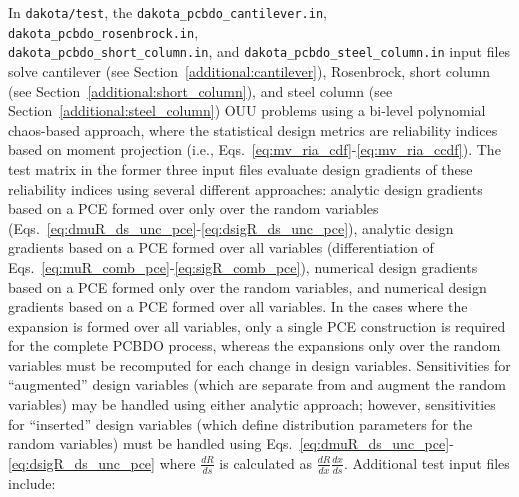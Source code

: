 In \texttt{dakota/test}, the \texttt{dakota\_pcbdo\_cantilever.in},
\texttt{dakota\_pcbdo\_rosenbrock.in},\\
\texttt{dakota\_pcbdo\_short\_column.in}, and
\texttt{dakota\_pcbdo\_steel\_column.in} input files solve 
cantilever (see Section~\ref{additional:cantilever}), Rosenbrock,
short column (see Section~\ref{additional:short_column}), and steel
column (see Section~\ref{additional:steel_column}) OUU problems using
a bi-level polynomial chaos-based approach, where the statistical
design metrics are reliability indices based on moment projection
(i.e., Eqs.~\ref{eq:mv_ria_cdf}-\ref{eq:mv_ria_ccdf}).  The test
matrix in the former three input files evaluate design gradients of
these reliability indices using several different approaches: analytic
design gradients based on a PCE formed over only over the random
variables (Eqs.~\ref{eq:dmuR_ds_unc_pce}-\ref{eq:dsigR_ds_unc_pce}),
analytic design gradients based on a PCE formed over all variables
(differentiation of
Eqs.~\ref{eq:muR_comb_pce}-\ref{eq:sigR_comb_pce}), numerical design
gradients based on a PCE formed only over the random variables, and
numerical design gradients based on a PCE formed over all variables.
In the cases where the expansion is formed over all variables, only a
single PCE construction is required for the complete PCBDO process,
whereas the expansions only over the random variables must be
recomputed for each change in design variables.  Sensitivities for
``augmented'' design variables (which are separate from and augment
the random variables) may be handled using either analytic approach;
however, sensitivities for ``inserted'' design variables (which define
distribution parameters for the random variables) must be handled
using Eqs.~\ref{eq:dmuR_ds_unc_pce}-\ref{eq:dsigR_ds_unc_pce} where
$\frac{dR}{ds}$ is calculated as $\frac{dR}{dx} \frac{dx}{ds}$.
Additional test input files include:
